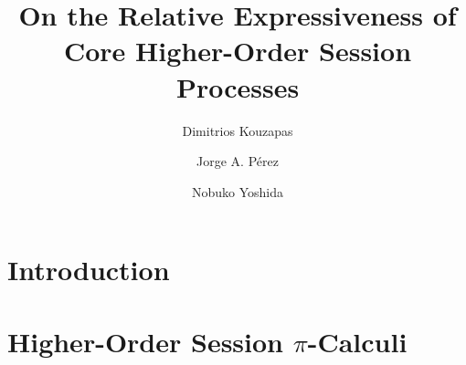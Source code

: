 \documentclass[runningheads]{llncs}
\begin{document}



\title{On the Relative Expressiveness of \\ Core Higher-Order Session Processes}

\author{
	Dimitrios Kouzapas%
	\and
	Jorge A. P\'{e}rez
	\and Nobuko Yoshida
}
\maketitle









%

%

\section{Introduction}
\label{sec:intro}


%

\section{Higher-Order Session $\pi$-Calculi}
\label{sec:calculus}

\end{document}
